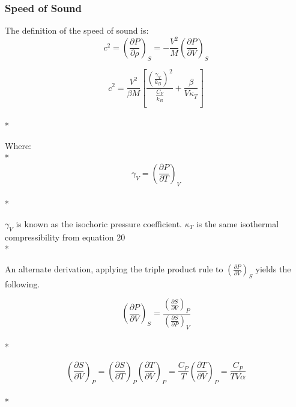 \documentclass[9pt,bestpractices]{livecoms}
\begin{document}

\subsubsection{Speed of Sound}
The definition of the speed of sound is\cite{sos}:
\begin{equation}c^2 = \left(\frac{\partial P}{\partial \rho}\right)_{S} = -\frac{V^2}{M}\left(\frac{\partial P}{\partial V}\right)_{S}\end{equation}


\begin{equation}c^2 = \frac{V^2}{\beta M}\left[\frac{\left(\frac{\gamma_V}{k_B}\right)^2}{\frac{C_V}{k_B}} + \frac{\beta}{V \kappa_T}\right]\end{equation}\\*

Where:\\*
\begin{equation}\gamma_V = \left(\frac{\partial P}{\partial T}\right)_{V}\end{equation}\\*

 $\gamma_V$ is known as the isochoric pressure coefficient. $\kappa_T$ is the same isothermal compressibility from equation 20\\*

An alternate derivation, applying the triple product rule to $\left(\frac{\partial P}{\partial V}\right)_{S}$ yields the following.

\begin{equation}\left(\frac{\partial P}{\partial V}\right)_{S} = \frac{\left(\frac{\partial S}{\partial V}\right)_{P}}{\left(\frac{\partial S}{\partial P}\right)_{V}}\end{equation}\\*

\begin{equation}\left(\frac{\partial S}{\partial V}\right)_{P} = \left(\frac{\partial S}{\partial T}\right)_{P} \left(\frac{\partial T}{\partial V}\right)_{P} = \frac{C_P}{T} \left(\frac{\partial T}{\partial V}\right)_{P} = \frac{C_P}{T V \alpha}\end{equation}\\*
\end{document}
